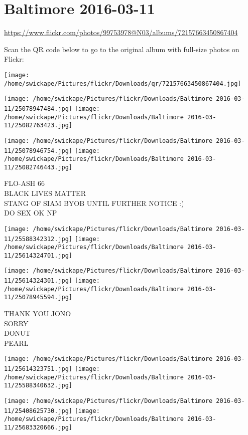 \documentclass[10pt,letterpaper]{article}
\title{}
\author{}
\date{}
\begin{document}
\section*{Baltimore 2016-03-11}

\url{https://www.flickr.com/photos/99753978@N03/albums/72157663450867404}

Scan the QR code below to go to the original album with full-size photos on Flickr:

\texttt{[image: /home/swickape/Pictures/flickr/Downloads/qr/72157663450867404.jpg]}
\pagebreak

\texttt{[image: /home/swickape/Pictures/flickr/Downloads/Baltimore 2016-03-11/25078947484.jpg]}
\texttt{[image: /home/swickape/Pictures/flickr/Downloads/Baltimore 2016-03-11/25082763423.jpg]}

\texttt{[image: /home/swickape/Pictures/flickr/Downloads/Baltimore 2016-03-11/25078946754.jpg]}
\texttt{[image: /home/swickape/Pictures/flickr/Downloads/Baltimore 2016-03-11/25082746443.jpg]}

FLO{-}ASH 66\\
BLACK LIVES MATTER\\
STANG OF SIAM BYOB UNTIL FURTHER NOTICE :)\\
DO SEX OK NP
\pagebreak

\texttt{[image: /home/swickape/Pictures/flickr/Downloads/Baltimore 2016-03-11/25588342312.jpg]}
\texttt{[image: /home/swickape/Pictures/flickr/Downloads/Baltimore 2016-03-11/25614324701.jpg]}

\texttt{[image: /home/swickape/Pictures/flickr/Downloads/Baltimore 2016-03-11/25614324301.jpg]}
\texttt{[image: /home/swickape/Pictures/flickr/Downloads/Baltimore 2016-03-11/25078945594.jpg]}

THANK YOU JONO\\
SORRY\\
DONUT\\
PEARL
\pagebreak

\texttt{[image: /home/swickape/Pictures/flickr/Downloads/Baltimore 2016-03-11/25614323751.jpg]}
\texttt{[image: /home/swickape/Pictures/flickr/Downloads/Baltimore 2016-03-11/25588340632.jpg]}

\texttt{[image: /home/swickape/Pictures/flickr/Downloads/Baltimore 2016-03-11/25408625730.jpg]}
\texttt{[image: /home/swickape/Pictures/flickr/Downloads/Baltimore 2016-03-11/25683320666.jpg]}
\end{document}
